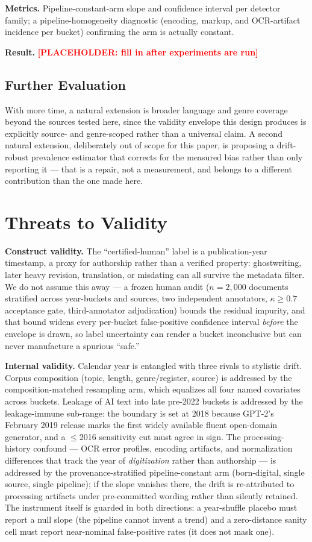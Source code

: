 \documentclass[conference]{IEEEtran}
\newcommand{\placeholder}[1]{\textcolor{red}{\textbf{[PLACEHOLDER: #1]}}}
\begin{document}
\textbf{Metrics.} Pipeline-constant-arm slope and confidence interval per detector family; a pipeline-homogeneity diagnostic (encoding, markup, and OCR-artifact incidence per bucket) confirming the arm is actually constant.

\textbf{Result.} \placeholder{fill in after experiments are run}


\subsection{Further Evaluation}
With more time, a natural extension is broader language and genre coverage beyond the sources tested here, since the validity envelope this design produces is explicitly source- and genre-scoped rather than a universal claim. A second natural extension, deliberately out of scope for this paper, is proposing a drift-robust prevalence estimator that corrects for the measured bias rather than only reporting it --- that is a repair, not a measurement, and belongs to a different contribution than the one made here.

\section{Threats to Validity}\label{sec:threats}

\textbf{Construct validity.} The ``certified-human'' label is a publication-year timestamp, a proxy for authorship rather than a verified property: ghostwriting, later heavy revision, translation, or misdating can all survive the metadata filter. We do not assume this away --- a frozen human audit ($n=2{,}000$ documents stratified across year-buckets and sources, two independent annotators, $\kappa \geq 0.7$ acceptance gate, third-annotator adjudication) bounds the residual impurity, and that bound widens every per-bucket false-positive confidence interval \emph{before} the envelope is drawn, so label uncertainty can render a bucket inconclusive but can never manufacture a spurious ``safe.''

\textbf{Internal validity.} Calendar year is entangled with three rivals to stylistic drift. Corpus composition (topic, length, genre/register, source) is addressed by the composition-matched resampling arm, which equalizes all four named covariates across buckets. Leakage of AI text into late pre-2022 buckets is addressed by the leakage-immune sub-range: the boundary is set at 2018 because GPT-2's February 2019 release marks the first widely available fluent open-domain generator, and a $\leq$2016 sensitivity cut must agree in sign. The processing-history confound --- OCR error profiles, encoding artifacts, and normalization differences that track the year of \emph{digitization} rather than authorship --- is addressed by the provenance-stratified pipeline-constant arm (born-digital, single source, single pipeline); if the slope vanishes there, the drift is re-attributed to processing artifacts under pre-committed wording rather than silently retained. The instrument itself is guarded in both directions: a year-shuffle placebo must report a null slope (the pipeline cannot invent a trend) and a zero-distance sanity cell must report near-nominal false-positive rates (it does not mask one).
\end{document}
